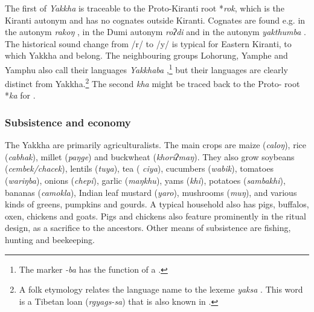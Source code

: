 The first  of  \emph{Yakkha} is traceable to the Proto-Kiranti root *\emph{rok}, which is the Kiranti autonym and has no cognates outside Kiranti. Cognates are found e.g. in the  autonym \emph{rakoŋ} \citep{Bickeletal2009Puma}, in the Dumi autonym \emph{roʔdi} \citep[413]{Driem1993A-grammar} and in the  autonym \emph{yakthumba} \citep[xix]{Driem1987A-grammar}.  The historical sound change from  /r/ to /y/ is typical for Eastern Kiranti, to which Yakkha and  belong. The neighbouring groups Lohorung, Yamphe and Yamphu  also call their languages \emph{Yakkhaba} \citep[347]{Driem1994The-Yakkha},\footnote{The marker \emph{-ba} has the function of a .}  but their languages are clearly distinct from Yakkha.\footnote{A folk etymology relates the language name to the  lexeme \emph{yaksa}  \citep[87]{Kongren2007Indigenous}. This word is a Tibetan loan (\emph{rgyags-sa})  that is also known in  \citep{Turner1931A-Comparative}.} The second  \emph{kha} might be traced back to the Proto- root  *\emph{ka} for  \citep[174]{Matisoff2003Handbook}.

   
\subsubsection{Subsistence and economy}
 
The Yakkha are primarily agriculturalists. The main crops are maize (\emph{caloŋ}), rice (\emph{cabhak}), millet (\emph{paŋge}) and  buckwheat (\emph{khoriʔmaŋ}). They also grow soybeans (\emph{cembek/chacek}), lentils (\emph{tuya}), tea ( \emph{ciya}), cucumbers (\emph{wabik}), tomatoes (\emph{wa\-riŋba}), onions (\emph{chepi}), garlic (\emph{maŋkhu}), yams (\emph{khi}), potatoes (\emph{sambakhi}), bananas (\emph{camokla}), Indian leaf mustard (\emph{yaro}), mushrooms (\emph{muŋ}), and various kinds of greens, pumpkins and gourds. A typical household also has pigs, buffalos, oxen, chickens and goats. Pigs and chickens also feature prominently in the ritual design, as a sacrifice to the ancestors. Other means of subsistence are fishing, hunting  and beekeeping.  

